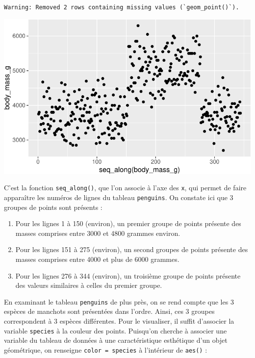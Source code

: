 \documentclass[
  a4paper,
  DIV=11,
  numbers=noendperiod,
  oneside]{scrreprt}
\providecommand{\tightlist}{%
  \setlength{\itemsep}{0pt}\setlength{\parskip}{0pt}}\usepackage{longtable,booktabs,array}
\begin{document}
\begin{verbatim}
Warning: Removed 2 rows containing missing values (`geom_point()`).
\end{verbatim}

\includegraphics{03-visualization_files/figure-pdf/unnamed-chunk-26-1.pdf}

C'est la fonction \texttt{seq\_along()}, que l'on associe à l'axe des
\texttt{x}, qui permet de faire apparaître les numéros de lignes du
tableau \texttt{penguins}. On constate ici que 3 groupes de points sont
présents :

\begin{enumerate}
\def\labelenumi{\arabic{enumi}.}
\tightlist
\item
  Pour les lignes 1 à 150 (environ), un premier groupe de points
  présente des masses comprises entre 3000 et 4800 grammes environ.
\item
  Pour les lignes 151 à 275 (environ), un second groupes de points
  présente des masses comprises entre 4000 et plus de 6000 grammes.
\item
  Pour les lignes 276 à 344 (environ), un troisième groupe de points
  présente des valeurs similaires à celles du premier groupe.
\end{enumerate}

En examinant le tableau \texttt{penguins} de plus près, on se rend
compte que les 3 espèces de manchots sont présentées dans l'ordre.
Ainsi, ces 3 groupes correspondent à 3 espèces différentes. Pour le
visualiser, il suffit d'associer la variable \texttt{species} à la
couleur des points. Puisqu'on cherche à associer une variable du tableau
de données à une caractéristique esthétique d'un objet géométrique, on
renseigne \texttt{color\ =\ species} à l'intérieur de \texttt{aes()} :
\end{document}
